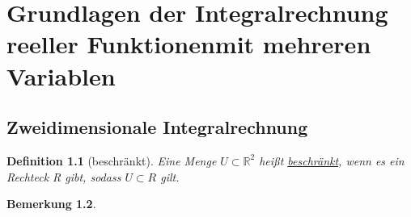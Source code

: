 \documentclass[12pt,a4paper]{scrreprt}
\newtheorem{defi}{Definition}[section]
\newtheorem{bemerkung}[defi]{Bemerkung}
\begin{document}
\chapter{Grundlagen der Integralrechnung reeller Funktionenmit mehreren Variablen}

	\section{Zweidimensionale Integralrechnung}

	\begin{defi}[beschränkt]
		Eine Menge $U\subset\mathbb{R}^2$ heißt \underline{beschränkt}, wenn es ein Rechteck R gibt, sodass $U\subset R$ gilt.
	\end{defi}

	\begin{bemerkung}
	\end{bemerkung}
	
\end{document}

